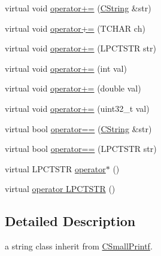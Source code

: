\begin{DoxyCompactItemize}
\item 
virtual void \hyperlink{class_c_string_a40bc4b86a267617199efa1bd1b4054eb}{operator+=} (\hyperlink{class_c_string}{C\-String} \&str)
\item 
virtual void \hyperlink{class_c_string_aa65a2be961ede8c8894248c4d6faba79}{operator+=} (T\-C\-H\-A\-R ch)
\item 
virtual void \hyperlink{class_c_string_a776672751c58502039234d6c78832a9b}{operator+=} (L\-P\-C\-T\-S\-T\-R str)
\item 
virtual void \hyperlink{class_c_string_ad0593358c21cca96aca2403be6d6ec92}{operator+=} (int val)
\item 
virtual void \hyperlink{class_c_string_abee606394e7b160c90aaa492febecdee}{operator+=} (double val)
\item 
virtual void \hyperlink{class_c_string_a33449318e0ed01e0307993e1f173747f}{operator+=} (uint32\-\_\-t val)
\item 
virtual bool \hyperlink{class_c_string_a960b7b752e43ec86a0851e30fa9f5f16}{operator==} (\hyperlink{class_c_string}{C\-String} \&str)
\item 
virtual bool \hyperlink{class_c_string_a6aee7112647fd18a9161497494418e16}{operator==} (L\-P\-C\-T\-S\-T\-R str)
\item 
virtual L\-P\-C\-T\-S\-T\-R \hyperlink{class_c_string_aab798ff84e78c0bce521dad477bcdfa6}{operator$\ast$} ()
\item 
virtual \hyperlink{class_c_string_a9149db10490c1d9c4c969043877f3cdb}{operator L\-P\-C\-T\-S\-T\-R} ()
\end{DoxyCompactItemize}


\subsection{Detailed Description}
a string class inherit from \hyperlink{class_c_small_printf}{C\-Small\-Printf}. 

